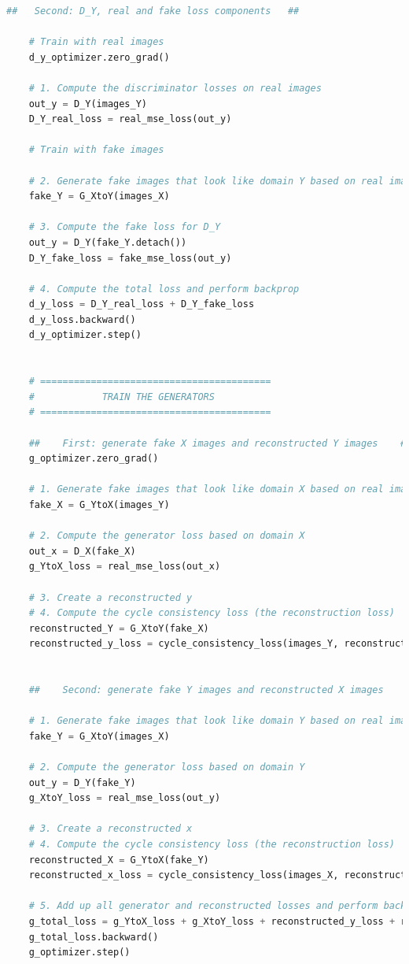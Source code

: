 \begin{lstlisting}[language=Python]
    ##   Second: D_Y, real and fake loss components   ##

    # Train with real images
    d_y_optimizer.zero_grad()

    # 1. Compute the discriminator losses on real images
    out_y = D_Y(images_Y)
    D_Y_real_loss = real_mse_loss(out_y)

    # Train with fake images

    # 2. Generate fake images that look like domain Y based on real images in domain X
    fake_Y = G_XtoY(images_X)

    # 3. Compute the fake loss for D_Y
    out_y = D_Y(fake_Y.detach())
    D_Y_fake_loss = fake_mse_loss(out_y)

    # 4. Compute the total loss and perform backprop
    d_y_loss = D_Y_real_loss + D_Y_fake_loss
    d_y_loss.backward()
    d_y_optimizer.step()


    # =========================================
    #            TRAIN THE GENERATORS
    # =========================================

    ##    First: generate fake X images and reconstructed Y images    ##
    g_optimizer.zero_grad()

    # 1. Generate fake images that look like domain X based on real images in domain Y
    fake_X = G_YtoX(images_Y)

    # 2. Compute the generator loss based on domain X
    out_x = D_X(fake_X)
    g_YtoX_loss = real_mse_loss(out_x)

    # 3. Create a reconstructed y
    # 4. Compute the cycle consistency loss (the reconstruction loss)
    reconstructed_Y = G_XtoY(fake_X)
    reconstructed_y_loss = cycle_consistency_loss(images_Y, reconstructed_Y, lambda_weight=10)


    ##    Second: generate fake Y images and reconstructed X images    ##

    # 1. Generate fake images that look like domain Y based on real images in domain X
    fake_Y = G_XtoY(images_X)

    # 2. Compute the generator loss based on domain Y
    out_y = D_Y(fake_Y)
    g_XtoY_loss = real_mse_loss(out_y)

    # 3. Create a reconstructed x
    # 4. Compute the cycle consistency loss (the reconstruction loss)
    reconstructed_X = G_YtoX(fake_Y)
    reconstructed_x_loss = cycle_consistency_loss(images_X, reconstructed_X, lambda_weight=10)

    # 5. Add up all generator and reconstructed losses and perform backprop
    g_total_loss = g_YtoX_loss + g_XtoY_loss + reconstructed_y_loss + reconstructed_x_loss
    g_total_loss.backward()
    g_optimizer.step()



\end{lstlisting}
